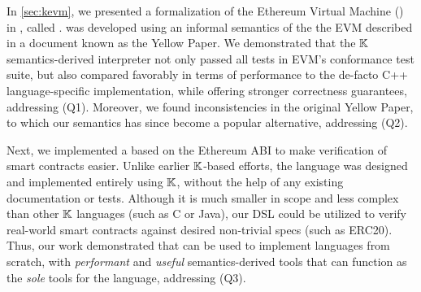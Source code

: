 In \autoref{sec:kevm}, we presented a formalization of the
Ethereum Virtual Machine (\EVM{}) in \K{}, called \KEVM{}.
\KEVM{} was developed using an informal semantics of the
the EVM described in a document known as the Yellow Paper.
We demonstrated that the $\mathbb{K}{}$ semantics-derived
interpreter not only passed all tests in EVM's conformance test suite,
but also compared favorably in terms of performance to the de-facto
C++ language-specific implementation, while offering stronger correctness
guarantees, addressing (Q1). Moreover, we found inconsistencies
in the original Yellow Paper, to which our semantics has since become a popular
alternative, addressing (Q2).

Next, we implemented a \DSL{} based on the Ethereum ABI to make verification of
smart contracts easier. Unlike earlier $\mathbb{K}$-based efforts, the language was
designed and implemented entirely using $\mathbb{K}$, without the help of any
existing documentation or tests. Although it is much smaller in scope and
less complex than other $\mathbb{K}$ languages (such as C or Java), our DSL could be
utilized to verify real-world smart contracts against desired non-trivial specs
(such as ERC20). Thus, our work demonstrated that \K{} can be used to implement
languages from scratch, with \emph{performant} and \emph{useful}
semantics-derived tools that can function as the \emph{sole} tools for the
language, addressing (Q3).

